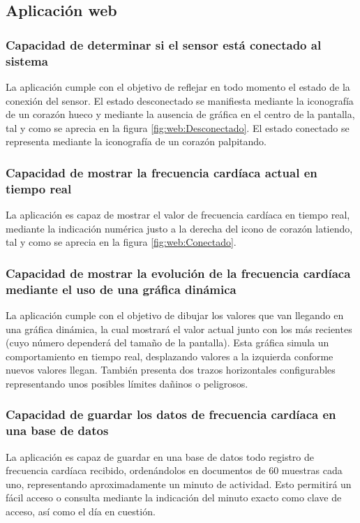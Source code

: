 \subsection{Aplicación web}

\subsubsection{Capacidad de determinar si el sensor está conectado al sistema}
	La aplicación cumple con el objetivo de reflejar en todo momento el estado de la conexión del sensor. El estado desconectado se manifiesta mediante la iconografía de un corazón hueco y mediante la ausencia de gráfica en el centro de la pantalla, tal y como se aprecia en la figura \ref{fig:web:Desconectado}. El estado conectado se representa mediante la iconografía de un corazón palpitando.
	
\subsubsection{Capacidad de mostrar la frecuencia cardíaca actual en tiempo real}
	La aplicación es capaz de mostrar el valor de frecuencia cardíaca en tiempo real, mediante la indicación numérica justo a la derecha del icono de corazón latiendo, tal y como se aprecia en la figura \ref{fig:web:Conectado}.
	
\subsubsection{Capacidad de mostrar la evolución de la frecuencia cardíaca mediante el uso de una gráfica dinámica}
	La aplicación cumple con el objetivo de dibujar los valores que van llegando en una gráfica dinámica, la cual mostrará el valor actual junto con los más recientes (cuyo número dependerá del tamaño de la pantalla). Esta gráfica simula un comportamiento en tiempo real, desplazando valores a la izquierda conforme nuevos valores llegan. También presenta dos trazos horizontales configurables representando unos posibles límites dañinos o peligrosos.

\subsubsection{Capacidad de guardar los datos de frecuencia cardíaca en una base de datos}
	La aplicación es capaz de guardar en una base de datos todo registro de frecuencia cardíaca recibido, ordenándolos en documentos de 60 muestras cada uno, representando aproximadamente un minuto de actividad. Esto permitirá un fácil acceso o consulta mediante la indicación del minuto exacto como clave de acceso, así como el día en cuestión.
	
